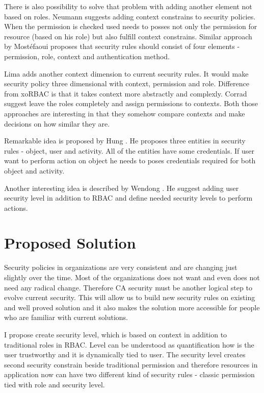 \documentclass{poster15}
\begin{document}
There is also possibility to solve that problem with adding another element not based on roles. Neumann \cite{xorbac} suggests adding context constrains to security policies. When the permission is checked used needs to posses not only the permission for resource (based on his role) but also fulfill context constrains. Similar approach by Most\'efaoui \cite{genericcontext} proposes that security rules should consist of four elements - permission, role, context and authentication method.

Lima \cite{contextlayer} adds another context dimension to current security rules. It would make security policy three dimensional with context, permission and role. Difference from xoRBAC \cite{xorbac} is that it takes context more abstractly and complexly. Corrad \cite{ubiscom} suggest leave the roles completely and assign permissions to contexts. Both those approaches are interesting in that they somehow compare contexts and make decisions on how similar they are.

Remarkable idea is proposed by Hung \cite{hung}. He proposes three entities in security rules - object, user and activity. All of the entities have some credentials. If user want to perform action on object he needs to poses credentials required for both object and activity.

Another interesting idea is described by Wendong \cite{wendong}. He suggest adding user security level in addition to RBAC and define needed security levels to perform actions.

\section{Proposed Solution}

Security policies in organizations are very consistent and are changing just slightly over the time. Most of the organizations does not want and even does not need any radical change. Therefore CA security must be another logical step to evolve current security. This will allow us to build new security rules on existing and well proved solution and it also makes the solution more accessible for people who are familiar with current solutions.

I propose create security level, which is based on context in addition to traditional roles in RBAC. Level can be understood as quantification how is the user trustworthy and it is dynamically tied to user. The security level creates second security constrain beside traditional permission and therefore resources in application now can have two different kind of security rules - classic permission tied with role and security level.
\end{document}

